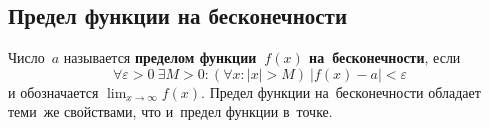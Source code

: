 \subsection{Предел функции на бесконечности}
Число~$a$ называется \textbf{пределом функции~$f(x)$ на~бесконечности}, если
\begin{equation*}
\forall \varepsilon > 0 \ \exists M > 0 \colon (\forall x \colon |x| > M) \ |f(x) - a| < \varepsilon
\end{equation*}
и обозначается $\displaystyle \lim_{x \to \infty} f(x)$.
Предел функции на~бесконечности обладает теми~же свойствами, что и~предел функции в~точке.